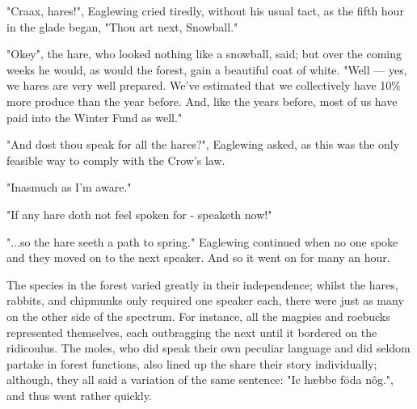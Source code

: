 "Craax, hares!", Eaglewing cried tiredly, without his usual tact, as the fifth hour in the glade began, "Thou art next, Snowball."


"Okey", the hare, who looked nothing like a snowball, said; but over the coming weeks he would, as would the forest, gain a beautiful coat of white. "Well — yes, we hares are very well prepared. We've estimated that we collectively have 10\% more produce than the year before. And, like the years before, most of us have paid into the Winter Fund as well."

"And dost thou speak for all the hares?", Eaglewing asked, as this was the only feasible way to comply with the Crow's law.

"Inasmuch as I'm aware."

"If any hare doth not feel spoken for - speaketh now!"

"...so the hare seeth a path to spring." Eaglewing continued when no one spoke and they moved on to the next speaker. And so it went on for many an hour. 

The species in the forest varied greatly in their independence; whilst the hares, rabbits, and chipmunks only required one speaker each, there were just as many on the other side of the spectrum. For instance, all the magpies and roebucks represented themselves, each outbragging the next until it bordered on the ridicoulus. The moles, who did speak their own peculiar language and did seldom partake in forest functions, also lined up the share their story individually; although, they all said a variation of the same sentence: "Ic hæbbe fōda nôg.", and thus went rather quickly.



